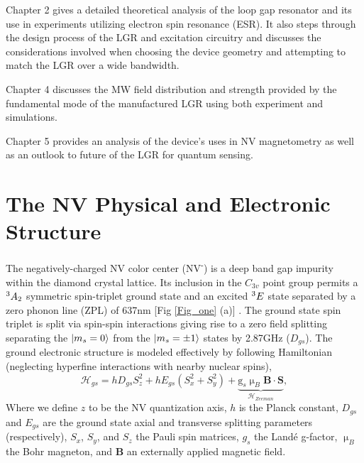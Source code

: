 Chapter 2 gives a detailed theoretical analysis of the loop gap resonator and its use in experiments utilizing electron spin resonance (ESR). It also steps through the design process of the LGR and excitation circuitry and discusses the considerations involved when choosing the device geometry and attempting to match the LGR over a wide bandwidth.


Chapter 4 discusses the MW field distribution and strength provided by the fundamental mode of the manufactured LGR using both experiment and simulations. 

Chapter 5 provides an analysis of the device's uses in NV magnetometry as well as an outlook to future of the LGR for quantum sensing.  


\section{The NV Physical and Electronic Structure} \label{sec:NVP}


The negatively-charged NV color center (NV\textsuperscript{-}) is a deep band gap impurity within the diamond crystal lattice. Its inclusion in the $C_{3v}$ point group permits a $\textsuperscript{3}A_2$ symmetric spin-triplet ground state and an excited $\textsuperscript{3}E$ state separated by a zero phonon line (ZPL) of 637nm [Fig \ref{Fig_one} (a)] \cite{maze2011properties}. The ground state spin triplet is split via spin-spin interactions giving rise to a zero field splitting separating the $\ket{m_s = 0}$ from the $\ket{m_s = \pm 1}$ states by 2.87GHz ($D_{gs}$). 
The ground electronic structure is modeled effectively by following Hamiltonian (neglecting hyperfine interactions with nearby nuclear spins),
\begin{equation}\label{hamiltonian}
\mathcal{H}_{gs} = h D_{gs}S_z^2+h E_{gs}(S_x^2+S_y^2)+\underbrace{\text{g}_s \upmu_B\textbf{B}\cdot\textbf{S}}_{\mathcal{H}_{Zeeman}}, 
\end{equation}
Where we define $z$ to be the NV quantization axis, $h$ is the Planck constant, $D_{gs}$ and $E_{gs}$ are the ground state axial and transverse splitting parameters (respectively), $S_x$, $S_y$, and $S_z$ the Pauli spin matrices, $g_s$ the Land\'e g-factor, $\upmu_B$ the Bohr magneton, and $\textbf{B}$ an externally applied magnetic field. \\

